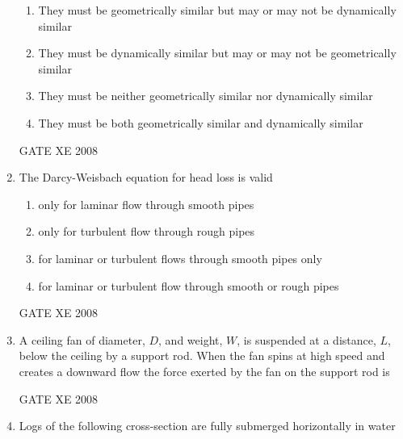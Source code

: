 \documentclass[12pt]{article}
\begin{document}
\begin{enumerate}[label=Q\arabic*.]
\begin{enumerate}[label=(\Alph*)]
\item  They must be geometrically similar but may or may not be dynamically similar

\item  They must be dynamically similar but may or may not be geometrically similar

\item  They must be neither geometrically similar nor dynamically similar

\item  They must be both geometrically similar and dynamically similar
\end{enumerate}

GATE XE 2008
\item  The Darcy-Weisbach equation for head loss is valid

\begin{enumerate}[label=(\Alph*)]
\item  only for laminar flow through smooth pipes

\item  only for turbulent flow through rough pipes

\item  for laminar or turbulent flows through smooth pipes only

\item  for laminar or turbulent flow through smooth or rough pipes
\end{enumerate}

GATE XE 2008
\item A ceiling fan of diameter, $D$, and weight, $W$, is suspended at a distance, $L$, below the ceiling by a support rod. When the fan spins at high speed and creates a downward flow the force exerted by the fan on the support rod is

\begin{enumerate}[label=(\Alph*)]
\end{enumerate}

GATE XE 2008
\item Logs of the following cross-section are fully submerged horizontally in water



\end{enumerate}
\end{document}
